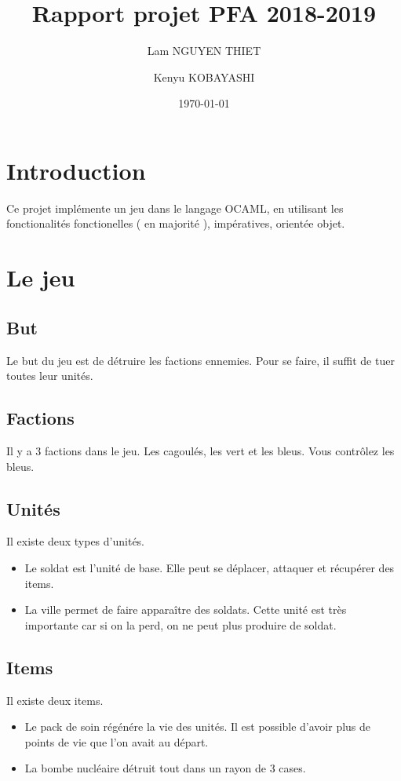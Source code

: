 \documentclass{article}
\title{Rapport projet PFA 2018-2019}
\date{\today}
\author{Lam NGUYEN THIET
\and Kenyu KOBAYASHI}
\begin{document}
\maketitle
\section{Introduction}
Ce projet implémente un jeu dans le langage OCAML, en utilisant les fonctionalités fonctionelles ( en majorité ), impératives, orientée objet.

\section{Le jeu}
\subsection{But}
Le but du jeu est de détruire les factions ennemies. Pour se faire, il suffit de tuer toutes leur unités.

\subsection{Factions}
Il y a 3 factions dans le jeu. Les cagoulés, les vert et les bleus. Vous contrôlez les bleus.

\subsection{Unités}
Il existe deux types d'unités.

\begin{itemize}
    \item Le soldat est l'unité de base. Elle peut se déplacer, attaquer et récupérer des items.
    \item La ville permet de faire apparaître des soldats. Cette unité est très importante car si on la perd, on ne peut plus produire de soldat.
\end{itemize}

\subsection{Items}
Il existe deux items.

\begin{itemize}
    \item Le pack de soin régénére la vie des unités. Il est possible d'avoir plus de points de vie que l'on avait au départ.
    \item La bombe nucléaire détruit tout dans un rayon de 3 cases.
\end{itemize}
\end{document}
